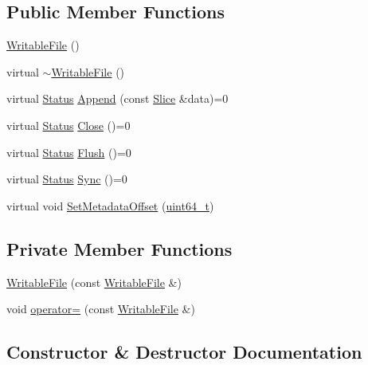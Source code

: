 \subsection*{Public Member Functions}
\begin{DoxyCompactItemize}
\item 
\hyperlink{classleveldb_1_1_writable_file_a48e7bcecb75e0339f0dafedb41c058ee}{Writable\+File} ()
\item 
virtual \hyperlink{classleveldb_1_1_writable_file_a6a2f4698544f04288fbee6ef354dd71d}{$\sim$\+Writable\+File} ()
\item 
virtual \hyperlink{classleveldb_1_1_status}{Status} \hyperlink{classleveldb_1_1_writable_file_a53b41841d9577d28f65d4d90e1660de8}{Append} (const \hyperlink{classleveldb_1_1_slice}{Slice} \&data)=0
\item 
virtual \hyperlink{classleveldb_1_1_status}{Status} \hyperlink{classleveldb_1_1_writable_file_a2efbf9c02a26028b5002df73b4393915}{Close} ()=0
\item 
virtual \hyperlink{classleveldb_1_1_status}{Status} \hyperlink{classleveldb_1_1_writable_file_ab95759ad32f6a05b0ee4266969fa265e}{Flush} ()=0
\item 
virtual \hyperlink{classleveldb_1_1_status}{Status} \hyperlink{classleveldb_1_1_writable_file_a2d2dcef02a2c9e71f3d39125bcd5a606}{Sync} ()=0
\item 
virtual void \hyperlink{classleveldb_1_1_writable_file_a552f0cd0732c1a78cdb949b66f2f737b}{Set\+Metadata\+Offset} (\hyperlink{stdint_8h_aaa5d1cd013383c889537491c3cfd9aad}{uint64\+\_\+t})
\end{DoxyCompactItemize}
\subsection*{Private Member Functions}
\begin{DoxyCompactItemize}
\item 
\hyperlink{classleveldb_1_1_writable_file_a3ef8319de3675e06b3dc25e263ab7f0a}{Writable\+File} (const \hyperlink{classleveldb_1_1_writable_file}{Writable\+File} \&)
\item 
void \hyperlink{classleveldb_1_1_writable_file_a8fb35a929c018260e2302d6cf13ce38d}{operator=} (const \hyperlink{classleveldb_1_1_writable_file}{Writable\+File} \&)
\end{DoxyCompactItemize}


\subsection{Constructor \& Destructor Documentation}
\hypertarget{classleveldb_1_1_writable_file_a48e7bcecb75e0339f0dafedb41c058ee}{}
